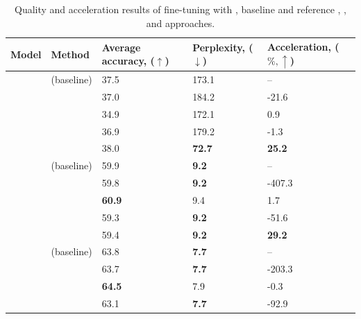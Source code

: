 \begin{table}[!t]
    \caption{Quality and acceleration results of fine-tuning with \ourmethodshort{}, baseline \lora{} and reference \dora{}, \pissa{}, and \adalora{} approaches.}
    \centering  
    \footnotesize
    \renewcommand{\arraystretch}{0.5}
    \begin{tabularx}{0.99\textwidth}{AM|TTT}

        \toprule

        \bfseries Model &
        \bfseries Method & 
        \bfseries Average accuracy, (\(\uparrow\)) & 
        \bfseries Perplexity, (\(\downarrow\)) &
        \bfseries Acceleration, (\(\%, \uparrow\)) \\

        \midrule 
        & \lora{} (baseline) & 37.5 & 173.1 & -- \\
        & \dora{} & 37.0 & 184.2 & -21.6 \\
        & \pissa{} & 34.9 & 172.1 & 0.9 \\
        & \adalora{} & 36.9 & 179.2 & -1.3 \\
        &  \ourmethodshort{} &  38.0 &  \bfseries 72.7 &  \bfseries 25.2 \\
        \midrule
        & \lora{} (baseline) & 59.9 & \bfseries 9.2 & -- \\
        & \dora{} & 59.8 & \bfseries 9.2 & -407.3 \\
        & \pissa{} & \bfseries 60.9 & 9.4 & 1.7 \\
        & \adalora{} & 59.3 & \bfseries 9.2 & -51.6 \\
        &  \ourmethodshort{} &  59.4 &  \bfseries 9.2 &  \bfseries 29.2 \\
        \midrule
        & \lora{} (baseline) & 63.8 & \bfseries 7.7 & -- \\
        & \dora{} & 63.7 & \bfseries 7.7 & -203.3 \\
        & \pissa{} & \bfseries 64.5 & 7.9 & -0.3 \\
        & \adalora{} & 63.1 & \bfseries 7.7 & -92.9 \\

\end{tabularx}
\end{table}
